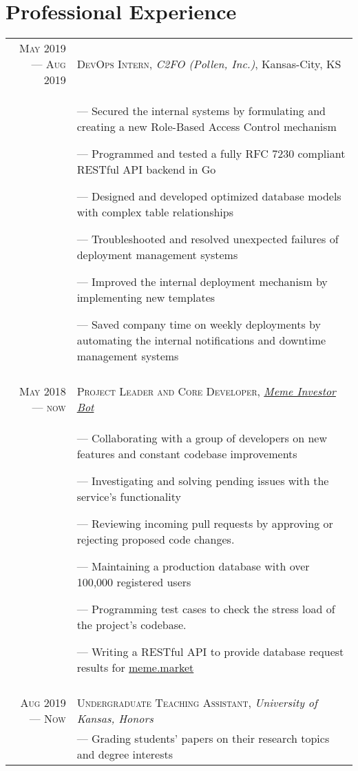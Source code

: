 \documentclass[letterpaper,10pt]{article}
\begin{document}
\section{Professional Experience}
\begin{tabular}{r|p{11cm}}
  
  \textsc{May 2019 --- Aug 2019} &  \textsc{DevOps Intern}, \emph{C2FO (Pollen, Inc.)}, Kansas-City, KS\\&\footnotesize{
    --- Secured the internal systems by formulating and creating a new Role-Based Access Control mechanism
   
    --- Programmed and tested a fully RFC 7230 compliant RESTful API backend in Go 
    
    --- Designed and developed optimized database models with complex table relationships
    
    --- Troubleshooted and resolved unexpected failures of deployment management systems
    
    --- Improved the internal deployment mechanism by implementing new templates
    
    --- Saved company time on weekly deployments by automating the internal notifications and downtime management systems

  } \\\multicolumn{2}{c}{}\\
  
  \textsc{May 2018 --- now} &  \textsc{Project Leader and Core Developer}, \emph{\href{https://github.com/MemeInvestor/memeinvestor_bot}{Meme Investor Bot}}\\&\footnotesize{
    --- Collaborating with a group of developers on new features and constant codebase improvements
    
    --- Investigating and solving pending issues with the service's functionality
    
    --- Reviewing incoming pull requests by approving or rejecting proposed code changes.
    
    --- Maintaining a production database with over 100,000 registered users
    
    --- Programming test cases to check the stress load of the project's codebase.

    --- Writing a RESTful API to provide database request results for \href{https://meme.market}{meme.market}
  } \\\multicolumn{2}{c}{}\\
  
  \textsc{Aug 2019 --- Now} &  \textsc{Undergraduate Teaching Assistant}, \emph{University of Kansas, Honors}\\&\footnotesize{
    --- Grading students' papers on their research topics and degree interests
        
}
\end{tabular}
\end{document}
